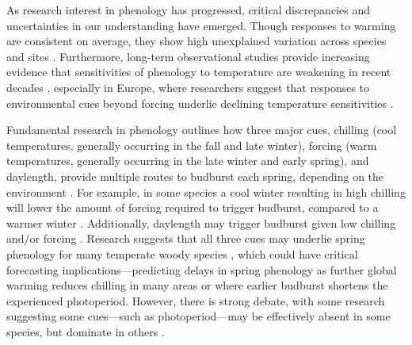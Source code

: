 \documentclass{article}
\begin{document}
\par As research interest in phenology has progressed, critical discrepancies and uncertainties in our understanding have emerged. Though responses to warming are consistent on average, they show high unexplained variation across species and sites \citep{Wolkovich:2012n}. Furthermore, long-term observational studies provide increasing evidence that sensitivities of phenology to temperature are weakening in recent decades \cite{Rutishauser:2008,yu2010}, especially in Europe, where researchers suggest that responses to environmental cues beyond forcing underlie declining temperature sensitivities  \cite{fu2015}.

\par Fundamental research in phenology outlines how three major cues, chilling (cool temperatures, generally occurring in the fall and late winter), forcing (warm temperatures, generally occurring in the late winter and early spring), and daylength, provide multiple routes to budburst each spring, depending on the environment \citep{chuineJTB}. For example, in some species a cool winter resulting in high chilling will lower the amount of forcing required to trigger budburst, compared to a warmer winter \citep{harrington2015}. Additionally, daylength may trigger budburst given low chilling and/or forcing \citep{Basler:2014aa, Caffarra:2011b, zohner2016}. Research suggests that all three cues may underlie spring phenology for many temperate woody species \citep{flynn2018,Basler:2014aa,Caffarra:2011qf}, which could have critical forecasting implications---predicting delays in spring phenology as further global warming reduces chilling in many areas \citep{fraga2019} or where earlier budburst shortens the experienced photoperiod.  However, there is strong debate, with some research suggesting some cues---such as photoperiod---may be effectively absent in some species, but dominate in others \citep{zohner2016,koerner2010a}. 
\end{document}
